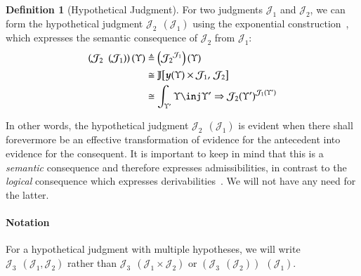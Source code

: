 \documentclass[11pt]{article}
\theoremstyle{definition}
\newtheorem{definition}[thm]{Definition}
\theoremstyle{remark}
\numberwithin{equation}{section}
\def\IModeColorName{MidnightBlue}
\def\OModeColorName{Maroon}
\def\IModeColorName{Black}
\def\OModeColorName{Black}
\newcommand\IMode[1]{{\color{\IModeColorName}{#1}}}
\newcommand\OMode[1]{{\color{\OModeColorName}{#1}}}
\newcommand\HypJ[2]{#1\ \ (#2)}
\newcommand\Hom[3]{#1\!\left[#2,\,#3\right]}
\newcommand\ADefine[2]{\IMode{#1}&\triangleq\OMode{#2}}
\newcommand\Yoneda[1]{\boldsymbol{y} (#1)}
\begin{document}
\begin{definition}[Hypothetical Judgment]
  For two judgments $\mathcal{J}_1$ and $\mathcal{J}_2$, we can form the
  hypothetical judgment $\HypJ{\mathcal{J}_2}{\mathcal{J}_1}$ using the
  exponential construction~\cite[p.~46]{maclane-moerdijk:1992}, which expresses
  the semantic consequence of $\mathcal{J}_2$ from $\mathcal{J}_1$:
  \begin{align*}
    \ADefine{
      \left(\HypJ{\mathcal{J}_2}{\mathcal{J}_1}\right)(\Upsilon)
    }{
      \left({\mathcal{J}_2}^{\mathcal{J}_1}\right)(\Upsilon)
    }\\
    &\cong
    \OMode{
      \Hom{\mathbb{J}}{
        \Yoneda{\Upsilon}\times\mathcal{J}_1
      }{
        \mathcal{J}_2
      }
    }\\
    &\cong
    \OMode{
      \int_{\Upsilon'}{{\Upsilon\inj\Upsilon'}
        \Rightarrow{{{\mathcal{J}}_{2}(\Upsilon')}^{{\mathcal{J}}_{1}(\Upsilon')}}}
    }
  \end{align*}

  In other words, the hypothetical judgment
  $\HypJ{\mathcal{J}_2}{\mathcal{J}_1}$ is evident when there shall forevermore
  be an effective transformation of evidence for the antecedent into evidence
  for the consequent. It is important to keep in mind that this is a
  \emph{semantic} consequence and therefore expresses admissibilities, in
  contrast to the \emph{logical} consequence which expresses
  derivabilities~\cite{harper:2016}. We will not have any need for the latter.

  \paragraph{Notation}
  For a hypothetical judgment with multiple hypotheses, we will write
  $\HypJ{\mathcal{J}_3}{\mathcal{J}_1, \mathcal{J}_2}$ rather than
  $\HypJ{\mathcal{J}_3}{\mathcal{J}_1\times\mathcal{J}_2}$ or
  $\HypJ{(\HypJ{\mathcal{J}_3}{\mathcal{J}_2})}{\mathcal{J}_1}$.
\end{definition}
\end{document}
